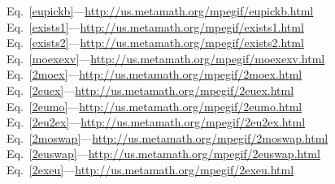 \documentclass{slides}
\begin{document}
\begin{slide}

Eq.~\ref{eupickb}---\url{http://us.metamath.org/mpegif/eupickb.html}       \\
Eq.~\ref{exists1}---\url{http://us.metamath.org/mpegif/exists1.html}       \\
Eq.~\ref{exists2}---\url{http://us.metamath.org/mpegif/exists2.html}       \\
Eq.~\ref{moexexv}---\url{http://us.metamath.org/mpegif/moexexv.html} \\
Eq.~\ref{2moex}---\url{http://us.metamath.org/mpegif/2moex.html} \\
Eq.~\ref{2euex}---\url{http://us.metamath.org/mpegif/2euex.html} \\
Eq.~\ref{2eumo}---\url{http://us.metamath.org/mpegif/2eumo.html} \\
Eq.~\ref{2eu2ex}---\url{http://us.metamath.org/mpegif/2eu2ex.html} \\
Eq.~\ref{2moswap}---\url{http://us.metamath.org/mpegif/2moswap.html} \\
Eq.~\ref{2euswap}---\url{http://us.metamath.org/mpegif/2euswap.html} \\
Eq.~\ref{2exeu}---\url{http://us.metamath.org/mpegif/2exeu.html} \\


\end{slide}
\end{document}
